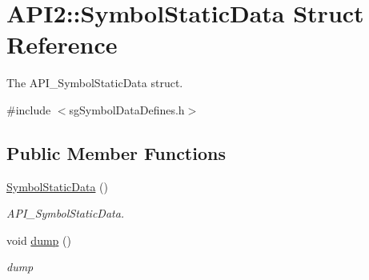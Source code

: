 \hypertarget{struct_a_p_i2_1_1_symbol_static_data}{\section{A\-P\-I2\-:\-:Symbol\-Static\-Data Struct Reference}
\label{struct_a_p_i2_1_1_symbol_static_data}
}


The A\-P\-I\-\_\-\-Symbol\-Static\-Data struct.  




{\ttfamily \#include $<$sg\-Symbol\-Data\-Defines.\-h$>$}

\subsection*{Public Member Functions}
\begin{DoxyCompactItemize}
\item 
\hypertarget{struct_a_p_i2_1_1_symbol_static_data_a5ef1fdea553d2b4671968a7f8c4e4ec6}{\hyperlink{struct_a_p_i2_1_1_symbol_static_data_a5ef1fdea553d2b4671968a7f8c4e4ec6}{Symbol\-Static\-Data} ()}\label{struct_a_p_i2_1_1_symbol_static_data_a5ef1fdea553d2b4671968a7f8c4e4ec6}

\begin{DoxyCompactList}\small\item\em A\-P\-I\-\_\-\-Symbol\-Static\-Data. \end{DoxyCompactList}\item 
\hypertarget{struct_a_p_i2_1_1_symbol_static_data_a07b71fafcd8de5f381348df218c6fd85}{void \hyperlink{struct_a_p_i2_1_1_symbol_static_data_a07b71fafcd8de5f381348df218c6fd85}{dump} ()}\label{struct_a_p_i2_1_1_symbol_static_data_a07b71fafcd8de5f381348df218c6fd85}

\begin{DoxyCompactList}\small\item\em dump \end{DoxyCompactList}\end{DoxyCompactItemize}
